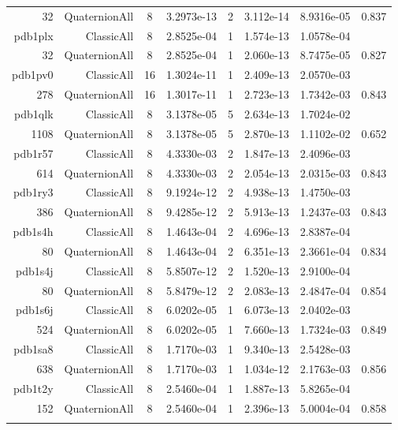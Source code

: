 \begin{xltabular}{\textwidth}{r|rcS[table-format=1.4e+2]cS[table-format=1.3e+2]S[table-format=1.4e+2]S[table-format=-1.3]}
32 & QuaternionAll & 8 & 3.2973e-13 & 2 & 3.112e-14 & 8.9316e-05 & 0.837\\  \addlinespace
pdb1plx & ClassicAll & 8 & 2.8525e-04 & 1 & 1.574e-13 & 1.0578e-04 & \\
32 & QuaternionAll & 8 & 2.8525e-04 & 1 & 2.060e-13 & 8.7475e-05 & 0.827\\  \addlinespace
pdb1pv0 & ClassicAll & 16 & 1.3024e-11 & 1 & 2.409e-13 & 2.0570e-03 & \\
278 & QuaternionAll & 16 & 1.3017e-11 & 1 & 2.723e-13 & 1.7342e-03 & 0.843\\  \addlinespace
pdb1qlk & ClassicAll & 8 & 3.1378e-05 & 5 & 2.634e-13 & 1.7024e-02 & \\
1108 & QuaternionAll & 8 & 3.1378e-05 & 5 & 2.870e-13 & 1.1102e-02 & 0.652\\  \addlinespace
pdb1r57 & ClassicAll & 8 & 4.3330e-03 & 2 & 1.847e-13 & 2.4096e-03 & \\
614 & QuaternionAll & 8 & 4.3330e-03 & 2 & 2.054e-13 & 2.0315e-03 & 0.843\\  \addlinespace
pdb1ry3 & ClassicAll & 8 & 9.1924e-12 & 2 & 4.938e-13 & 1.4750e-03 & \\
386 & QuaternionAll & 8 & 9.4285e-12 & 2 & 5.913e-13 & 1.2437e-03 & 0.843\\  \addlinespace
pdb1s4h & ClassicAll & 8 & 1.4643e-04 & 2 & 4.696e-13 & 2.8387e-04 & \\
80 & QuaternionAll & 8 & 1.4643e-04 & 2 & 6.351e-13 & 2.3661e-04 & 0.834\\  \addlinespace
pdb1s4j & ClassicAll & 8 & 5.8507e-12 & 2 & 1.520e-13 & 2.9100e-04 & \\
80 & QuaternionAll & 8 & 5.8479e-12 & 2 & 2.083e-13 & 2.4847e-04 & 0.854\\  \addlinespace
pdb1s6j & ClassicAll & 8 & 6.0202e-05 & 1 & 6.073e-13 & 2.0402e-03 & \\
524 & QuaternionAll & 8 & 6.0202e-05 & 1 & 7.660e-13 & 1.7324e-03 & 0.849\\  \addlinespace
pdb1sa8 & ClassicAll & 8 & 1.7170e-03 & 1 & 9.340e-13 & 2.5428e-03 & \\
638 & QuaternionAll & 8 & 1.7170e-03 & 1 & 1.034e-12 & 2.1763e-03 & 0.856\\  \addlinespace
pdb1t2y & ClassicAll & 8 & 2.5460e-04 & 1 & 1.887e-13 & 5.8265e-04 & \\
152 & QuaternionAll & 8 & 2.5460e-04 & 1 & 2.396e-13 & 5.0004e-04 & 0.858\\  \addlinespace

\end{xltabular}
